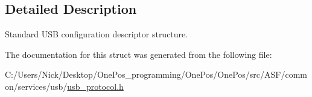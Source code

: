 \subsection{Detailed Description}
Standard U\-S\-B configuration descriptor structure. 

The documentation for this struct was generated from the following file\-:\begin{DoxyCompactItemize}
\item 
C\-:/\-Users/\-Nick/\-Desktop/\-One\-Pos\-\_\-programming/\-One\-Pos/\-One\-Pos/src/\-A\-S\-F/common/services/usb/\hyperlink{usb__protocol_8h}{usb\-\_\-protocol.\-h}\end{DoxyCompactItemize}
